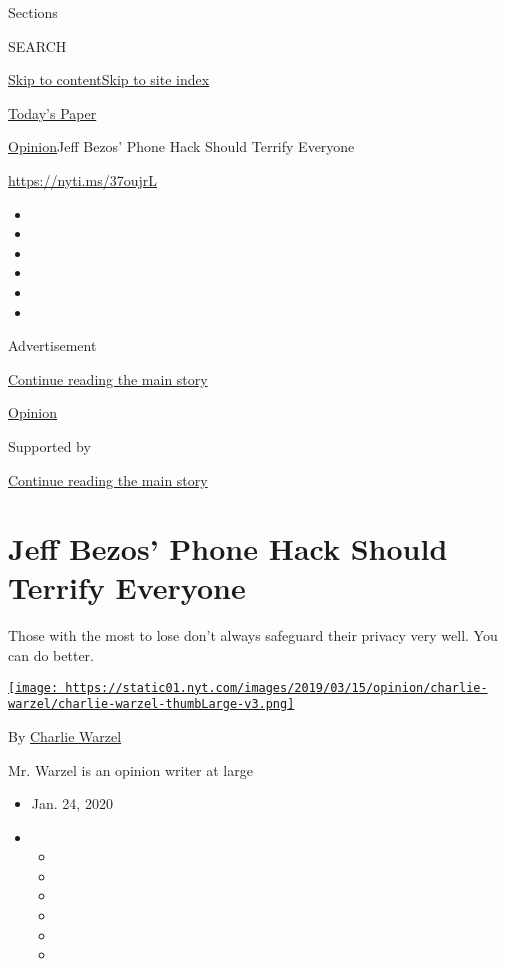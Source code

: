 Sections

SEARCH

\protect\hyperlink{site-content}{Skip to
content}\protect\hyperlink{site-index}{Skip to site index}

\href{https://myaccount.nytimes.com/auth/login?response_type=cookie\&client_id=vi}{}

\href{https://www.nytimes.com/section/todayspaper}{Today's Paper}

\href{/section/opinion}{Opinion}\textbar{}Jeff Bezos' Phone Hack Should
Terrify Everyone

\url{https://nyti.ms/37oujrL}

\begin{itemize}
\item
\item
\item
\item
\item
\item
\end{itemize}

Advertisement

\protect\hyperlink{after-top}{Continue reading the main story}

\href{/section/opinion}{Opinion}

Supported by

\protect\hyperlink{after-sponsor}{Continue reading the main story}

\hypertarget{jeff-bezos-phone-hack-should-terrify-everyone}{%
\section{Jeff Bezos' Phone Hack Should Terrify
Everyone}\label{jeff-bezos-phone-hack-should-terrify-everyone}}

Those with the most to lose don't always safeguard their privacy very
well. You can do better.

\href{https://www.nytimes.com/by/charlie-warzel}{\texttt{[image: https://static01.nyt.com/images/2019/03/15/opinion/charlie-warzel/charlie-warzel-thumbLarge-v3.png]}}

By \href{https://www.nytimes.com/by/charlie-warzel}{Charlie Warzel}

Mr. Warzel is an opinion writer at large

\begin{itemize}
\item
  Jan. 24, 2020
\item
  \begin{itemize}
  \item
  \item
  \item
  \item
  \item
  \item
  \end{itemize}
\end{itemize}

